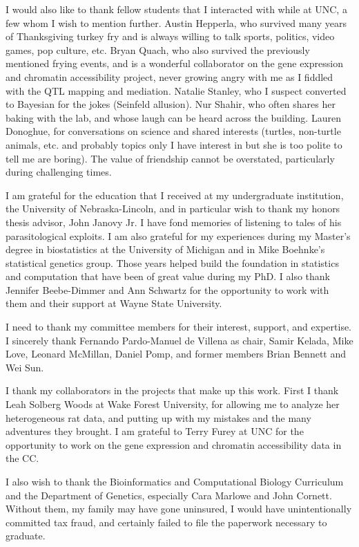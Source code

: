 I would also like to thank fellow students that I interacted with while at UNC, a few whom I wish to mention further. Austin Hepperla, who survived many years of Thanksgiving turkey fry and is always willing to talk sports, politics, video games, pop culture, etc. Bryan Quach, who also survived the previously mentioned frying events, and is a wonderful collaborator on the gene expression and chromatin accessibility project, never growing angry with me as I fiddled with the QTL mapping and mediation. Natalie Stanley, who I suspect converted to Bayesian for the jokes (Seinfeld allusion). Nur Shahir, who often shares her baking with the lab, and whose laugh can be heard across the building. Lauren Donoghue, for conversations on science and shared interests (turtles, non-turtle animals, etc. and probably topics only I have interest in but she is too polite to tell me are boring). The value of friendship cannot be overstated, particularly during challenging times.

I am grateful for the education that I received at my undergraduate institution, the University of Nebraska-Lincoln, and in particular wish to thank my honors thesis advisor, John Janovy Jr. I have fond memories of listening to tales of his parasitological exploits. I am also grateful for my experiences during my Master's degree in biostatistics at the University of Michigan and in Mike Boehnke's statistical genetics group. Those years helped build the foundation in statistics and computation that have been of great value during my PhD. I also thank Jennifer Beebe-Dimmer and Ann Schwartz for the opportunity to work with them and their support at Wayne State University.

I need to thank my committee members for their interest, support, and expertise. I sincerely thank Fernando Pardo-Manuel de Villena as chair, Samir Kelada, Mike Love, Leonard McMillan, Daniel Pomp, and former members Brian Bennett and Wei Sun.

I thank my collaborators in the projects that make up this work. First I thank Leah Solberg Woods at Wake Forest University, for allowing me to analyze her heterogeneous rat data, and putting up with my mistakes and the many adventures they brought. I am grateful to Terry Furey at UNC for the opportunity to work on the gene expression and chromatin accessibility data in the CC.

I also wish to thank the Bioinformatics and Computational Biology Curriculum and the Department of Genetics, especially Cara Marlowe and John Cornett. Without them, my family may have gone uninsured, I would have unintentionally committed tax fraud, and certainly failed to file the paperwork necessary to graduate.

